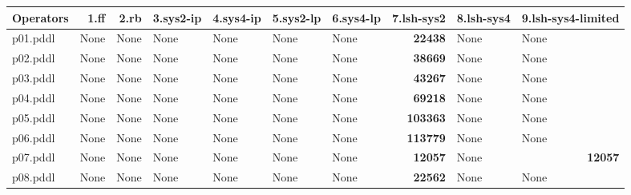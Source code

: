 \documentclass{article}
\begin{document}
\begin{tabular}{@{}lrrrrrrrrr@{}}
Operators & 1.ff & 2.rb & 3.sys2-ip & 4.sys4-ip & 5.sys2-lp & 6.sys4-lp & 7.lsh-sys2 & 8.lsh-sys4 & 9.lsh-sys4-limited \\
\midrule
p01.pddl & \multicolumn{1}{|l|}{None} & \multicolumn{1}{|l|}{None} & \multicolumn{1}{|l|}{None} & \multicolumn{1}{|l|}{None} & \multicolumn{1}{|l|}{None} & \multicolumn{1}{|l|}{None} & \textbf{22438} & \multicolumn{1}{|l|}{None} & \multicolumn{1}{|l|}{None} \\
p02.pddl & \multicolumn{1}{|l|}{None} & \multicolumn{1}{|l|}{None} & \multicolumn{1}{|l|}{None} & \multicolumn{1}{|l|}{None} & \multicolumn{1}{|l|}{None} & \multicolumn{1}{|l|}{None} & \textbf{38669} & \multicolumn{1}{|l|}{None} & \multicolumn{1}{|l|}{None} \\
p03.pddl & \multicolumn{1}{|l|}{None} & \multicolumn{1}{|l|}{None} & \multicolumn{1}{|l|}{None} & \multicolumn{1}{|l|}{None} & \multicolumn{1}{|l|}{None} & \multicolumn{1}{|l|}{None} & \textbf{43267} & \multicolumn{1}{|l|}{None} & \multicolumn{1}{|l|}{None} \\
p04.pddl & \multicolumn{1}{|l|}{None} & \multicolumn{1}{|l|}{None} & \multicolumn{1}{|l|}{None} & \multicolumn{1}{|l|}{None} & \multicolumn{1}{|l|}{None} & \multicolumn{1}{|l|}{None} & \textbf{69218} & \multicolumn{1}{|l|}{None} & \multicolumn{1}{|l|}{None} \\
p05.pddl & \multicolumn{1}{|l|}{None} & \multicolumn{1}{|l|}{None} & \multicolumn{1}{|l|}{None} & \multicolumn{1}{|l|}{None} & \multicolumn{1}{|l|}{None} & \multicolumn{1}{|l|}{None} & \textbf{103363} & \multicolumn{1}{|l|}{None} & \multicolumn{1}{|l|}{None} \\
p06.pddl & \multicolumn{1}{|l|}{None} & \multicolumn{1}{|l|}{None} & \multicolumn{1}{|l|}{None} & \multicolumn{1}{|l|}{None} & \multicolumn{1}{|l|}{None} & \multicolumn{1}{|l|}{None} & \textbf{113779} & \multicolumn{1}{|l|}{None} & \multicolumn{1}{|l|}{None} \\
p07.pddl & \multicolumn{1}{|l|}{None} & \multicolumn{1}{|l|}{None} & \multicolumn{1}{|l|}{None} & \multicolumn{1}{|l|}{None} & \multicolumn{1}{|l|}{None} & \multicolumn{1}{|l|}{None} & \textbf{12057} & \multicolumn{1}{|l|}{None} & \textbf{12057} \\
p08.pddl & \multicolumn{1}{|l|}{None} & \multicolumn{1}{|l|}{None} & \multicolumn{1}{|l|}{None} & \multicolumn{1}{|l|}{None} & \multicolumn{1}{|l|}{None} & \multicolumn{1}{|l|}{None} & \textbf{22562} & \multicolumn{1}{|l|}{None} & \multicolumn{1}{|l|}{None} \\

\end{tabular}
\end{document}
